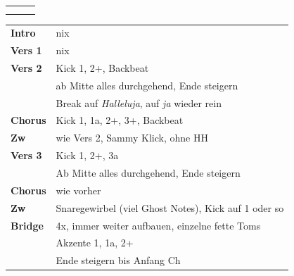 

\begin{tabular}{p{0.6cm}p{12cm}p{1.4cm}}
	\rowcolor{cyan} \myRow{\thesongnumber} & \myRow{Golgatha} & \myRow{79} \\
	                                       &                  &            \\
\end{tabular}

\begin{tabular}{p{1.6cm}l}
	\textbf{Intro}  & nix                                                       \\
	\textbf{Vers 1} & nix                                                       \\
	\textbf{Vers 2} & Kick 1, 2+, Backbeat                                      \\
	                & ab Mitte alles \achtel durchgehend, Ende steigern         \\
	                & Break auf \textit{Halleluja}, auf \textit{ja} wieder rein \\
	\textbf{Chorus} & Kick 1, 1a, 2+, 3+, Backbeat                              \\
	\textbf{Zw}     & wie Vers 2, Sammy Klick, ohne HH                            \\
	\textbf{Vers 3} & Kick 1, 2+, 3a                                            \\
	                & Ab Mitte alles \achtel durchgehend, Ende steigern         \\
	\textbf{Chorus} & wie vorher                                                \\
	\textbf{Zw}     & Snaregewirbel (viel Ghost Notes), Kick auf 1 oder so      \\
	\textbf{Bridge} & 4x, immer weiter aufbauen, einzelne fette Toms            \\
	                & Akzente 1, 1a, 2+                                         \\
	                & Ende \achtel steigern bis Anfang Ch                       \\

\end{tabular}
